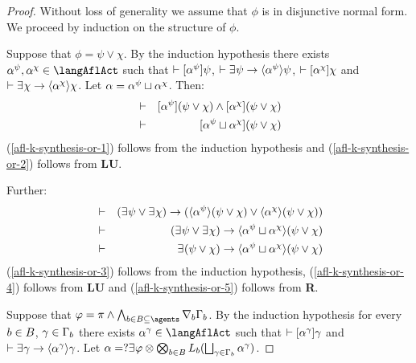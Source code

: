 \begin{proof}
Without loss of generality we assume that $\phi$ is in disjunctive normal form.
We proceed by induction on the structure of $\phi$.

Suppose that $\phi = \psi \lor \chi$.
By the induction hypothesis there exists $\alpha^\psi, \alpha^\chi \in \langAflAct$ such that $\vdash {[ {\alpha^\psi} ]} \psi$, $\proves \somerefs \psi \implies \actionE{\alpha^\psi} \psi$, $\vdash {[ {\alpha^\chi} ]} \chi$ and $\proves \somerefs \chi \implies \actionE{\alpha^\chi} \chi$.
Let $\alpha = \alpha^\psi \sqcup \alpha^\chi$.
Then:
\begin{eqnarray}
    &\vdash& {[ {\alpha^\psi} ]} (\psi \lor \chi) \land {[ {\alpha^\chi} ]} (\psi \lor \chi)\label{afl-k-synthesis-or-1}\\
    &\vdash& {[ {\alpha^\psi \sqcup \alpha^\chi} ]} (\psi \lor \chi)\label{afl-k-synthesis-or-2}
\end{eqnarray}
(\ref{afl-k-synthesis-or-1}) follows from the induction hypothesis and
(\ref{afl-k-synthesis-or-2}) follows from {\bf LU}.

Further:
\begin{eqnarray}
    &\proves& (\somerefs \psi \lor \somerefs \chi) \implies (\actionE{\alpha^\psi} (\psi \lor \chi) \lor \actionE{\alpha^\chi} (\psi \lor \chi))\label{afl-k-synthesis-or-3}\\
    &\proves& (\somerefs \psi \lor \somerefs \chi) \implies \actionE{\alpha^\psi \choice \alpha^\chi} (\psi \lor \chi)\label{afl-k-synthesis-or-4}\\
    &\proves& \somerefs (\psi \lor \chi) \implies \actionE{\alpha^\psi \choice \alpha^\chi} (\psi \lor \chi)\label{afl-k-synthesis-or-5}
\end{eqnarray}
(\ref{afl-k-synthesis-or-3}) follows from the induction hypothesis,
(\ref{afl-k-synthesis-or-4}) follows from {\bf LU} and
(\ref{afl-k-synthesis-or-5}) follows from {\bf R}.

Suppose that $\phi = \pi \land \bigwedge_{\agentB \in \agentsB \subseteq \agents} \coversB \Gamma_\agentB$.
By the induction hypothesis for every $b \in B$, $\gamma \in \Gamma_b$ there exists $\alpha^\gamma \in \langAflAct$ such that $\vdash {[ {\alpha^\gamma} ]} \gamma$ and $\proves \somerefs \gamma \implies \actionE{\alpha^\gamma} \gamma$.
Let $\alpha = \test{\somerefs \phi} \compose \bigcompose_{\agentB \in \agentsB} \learnsB (\bigchoice_{\gamma \in \Gamma_\agentB} \alpha^\gamma)$.


\end{proof}

